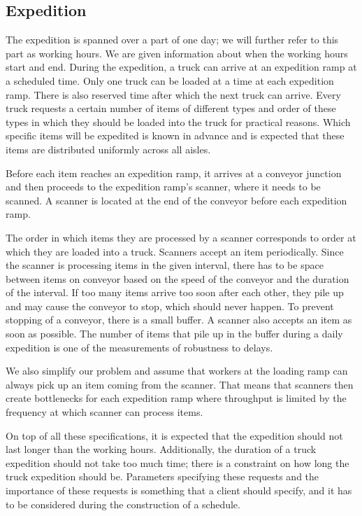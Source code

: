 \documentclass{ctuthesis}
\begin{document}
\subsection{Expedition}
The expedition is spanned over a part of one day; we will further refer to this part as working hours. We are given information about when the working hours start and end. During the expedition, a truck can arrive at an expedition ramp at a scheduled time. Only one truck can be loaded at a time at each expedition ramp. There is also reserved time after which the next truck can arrive. Every truck requests a certain number of items of different types and order of these types in which they should be loaded into the truck for practical reasons. Which specific items will be expedited is known in advance and is expected that these items are distributed uniformly across all aisles. 

Before each item reaches an expedition ramp, it arrives at a conveyor junction and then proceeds to the expedition ramp's scanner, where it needs to be scanned. A scanner is located at the end of the conveyor before each expedition ramp. 

The order in which items they are processed by a scanner corresponds to order at which they are loaded into a truck. Scanners accept an item periodically. Since the scanner is processing items in the given interval, there has to be space between items on conveyor based on the speed of the conveyor and the duration of the interval. If too many items arrive too soon after each other, they pile up and may cause the conveyor to stop, which should never happen. To prevent stopping of a conveyor, there is a small buffer. A scanner also accepts an item as soon as possible. The number of items that pile up in the buffer during a daily expedition is one of the measurements of robustness to delays.

We also simplify our problem and assume that workers at the loading ramp can always pick up an item coming from the scanner. That means that scanners then create bottlenecks for each expedition ramp where throughput is limited by the frequency at which scanner can process items.

On top of all these specifications, it is expected that the expedition should not last longer than the working hours. Additionally, the duration of a truck expedition should not take too much time; there is a constraint on how long the truck expedition should be. Parameters specifying these requests and the importance of these requests is something that a client should specify, and it has to be considered during the construction of a schedule.
\end{document}
